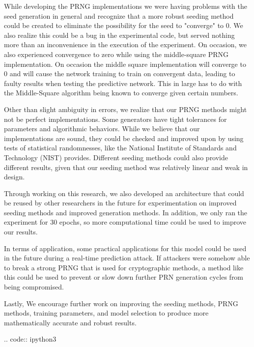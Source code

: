 \documentclass[conference]{IEEEtran}
\begin{document}
While developing the PRNG implementations we were having problems with the seed generation in general and recognize that a more robust seeding method could be created to eliminate the possibility for the seed to "converge" to 0. We also realize this could be a bug in the experimental code, but served nothing more than an inconvenience in the execution of the experiment. On occasion, we also experienced convergence to zero while using the middle-square PRNG implementation. On occasion the middle square implementation will converge to 0 and will cause the network training to train on convergent data, leading to faulty results when testing the predictive network. This in large has to do with the Middle-Square algorithm being known to converge given certain numbers.

Other than slight ambiguity in errors, we realize that our PRNG methods might not be perfect implementations. Some generators have tight tolerances for parameters and algorithmic behaviors. While we believe that our implementations are sound, they could be checked and improved upon by using tests of statistical randomnesses, like the National Institute of Standards and Technology (NIST) provides. 
Different seeding methods could also provide different results, given that our seeding method was relatively linear and weak in design.

Through working on this research, we also developed an architecture that could be reused by other researchers in the future for experimentation on improved seeding methods and improved generation methods. In addition, we only ran the experiment for 30 epochs, so more computational time could be used to improve our results.

In terms of application, some practical applications for this model could be used in the future during a real-time prediction attack. If attackers were somehow able to break a strong PRNG that is used for cryptographic methods, a method like this could be used to prevent or slow down further PRN generation cycles from being compromised. 

Lastly, We encourage further work on improving the seeding methods, PRNG methods, training parameters, and model selection to produce more mathematically accurate and robust results.

.. code:: ipython3

    
\end{document}
